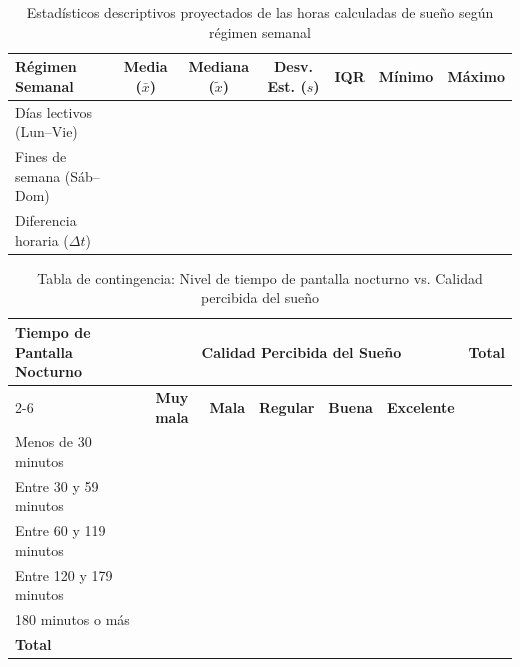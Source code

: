 \documentclass[12pt, letterpaper]{article}
\begin{document}
\vspace{0.3cm}

\begin{table}[H]
\centering
\caption{Estadísticos descriptivos proyectados de las horas calculadas de sueño según régimen semanal}
\label{tab:tabulacion2}
\vspace{0.25cm}
\small
\begin{tabular}{lcccccc}
\toprule
\textbf{Régimen Semanal} & \textbf{Media ($\bar{x}$)} & \textbf{Mediana ($\tilde{x}$)} & \textbf{Desv. Est. ($s$)} & \textbf{IQR} & \textbf{Mínimo} & \textbf{Máximo} \\
\midrule
Días lectivos (Lun--Vie) & & & & & & \\
Fines de semana (Sáb--Dom) & & & & & & \\
Diferencia horaria ($\Delta t$) & & & & & & \\
\bottomrule
\end{tabular}
\end{table}

\vspace{0.3cm}

\begin{table}[H]
\centering
\caption{Tabla de contingencia: Nivel de tiempo de pantalla nocturno vs. Calidad percibida del sueño}
\label{tab:tabulacion3}
\vspace{0.25cm}
\small
\begin{tabular}{lcccccc}
\toprule
\textbf{Tiempo de Pantalla Nocturno} & \multicolumn{5}{c}{\textbf{Calidad Percibida del Sueño}} & \textbf{Total} \\
\cmidrule(lr){2-6}
& \textbf{Muy mala} & \textbf{Mala} & \textbf{Regular} & \textbf{Buena} & \textbf{Excelente} & \\
\midrule
Menos de 30 minutos & & & & & & \\
Entre 30 y 59 minutos & & & & & & \\
Entre 60 y 119 minutos & & & & & & \\
Entre 120 y 179 minutos & & & & & & \\
180 minutos o más & & & & & & \\
\midrule
\textbf{Total} & & & & & & \\
\bottomrule
\end{tabular}
\end{table}

\vspace{0.3cm}
\end{document}
